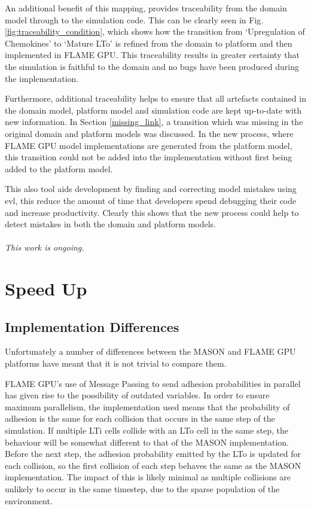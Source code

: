 \documentclass{UoYCSproject}
\begin{document}
An additional benefit of this mapping, provides traceability from the domain model through to the simulation code.
This can be clearly seen in Fig. \ref{fig:traceability_condition}, which shows how the transition from `Upregulation of Chemokines' to `Mature \gls{LTo}' is refined from the \gls{domain} to \gls{platform} and then implemented in \gls{FLAME GPU}.
This traceability results in greater certainty that the simulation is faithful to the domain and no bugs have been produced during the implementation.

Furthermore, additional traceability helps to ensure that all artefacts contained in the domain model, platform model and simulation code are kept up-to-date with new information.
In Section \ref{missing_link}, a transition which was missing in the original domain and platform models was discussed.
In the new process, where \gls{FLAME GPU} model implementations are generated from the platform model, this transition could not be added into the implementation without first being added to the platform model.

This also tool aids development by finding and correcting model mistakes using \gls{evl}, this reduce the amount of time that developers spend debugging their code and increase productivity.
Clearly this shows that the new process could help to detect mistakes in both the domain and platform models.
\\\\
\textit{This work is ongoing.}

\section{Speed Up}
\subsection{Implementation Differences}
Unfortunately a number of differences between the \gls{MASON} and \gls{FLAME GPU} platforms have meant that it is not trivial to compare them.

\gls{FLAME GPU}'s use of Message Passing to send adhesion probabilities in parallel has given rise to the possibility of outdated variables.
In order to ensure maximum parallelism, the implementation used means that the probability of adhesion is the same for each collision that occurs in the same step of the simulation.
If multiple \gls{LTi} cells collide with an \gls{LTo} cell in the same step, the behaviour will be somewhat different to that of the \gls{MASON} implementation.
Before the next step, the adhesion probability emitted by the \gls{LTo} is updated for each collision, so the first collision of each step behaves the same as the \gls{MASON} implementation.
The impact of this is likely minimal as multiple collisions are unlikely to occur in the same timestep, due to the sparse population of the environment.
\end{document}
